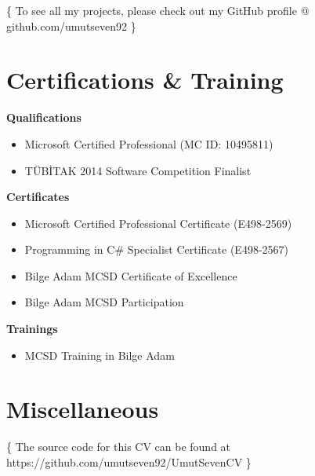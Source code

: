 \documentclass[11pt,a4paper,sans]{moderncv}        %
\begin{document}
\vspace{5px}

\color{color2} \centerline {\{ To see all my projects, please check out my GitHub profile @ github.com/umutseven92 \}}
\color{color3}

\vspace{5px}


\section{Certifications \& Training}
\vspace{5px}

\textbf{Qualifications}
\begin{itemize}
\item Microsoft Certified Professional (MC ID: 10495811)
\item TÜBİTAK 2014 Software Competition Finalist\newline{}
\end{itemize}
\textbf{Certificates}
\begin{itemize}
\item Microsoft Certified Professional Certificate (E498-2569)
\item Programming in C\# Specialist Certificate (E498-2567)
\item Bilge Adam MCSD Certificate of Excellence
\item Bilge Adam MCSD Participation\newline{}
\end{itemize}

\textbf{Trainings}
\begin{itemize}
\item MCSD Training in Bilge Adam\newline{}
\end{itemize}

\vspace{5px}


\section{Miscellaneous}
\vspace{5px}


               
\vspace*{\fill}
\color{color2} \centerline{\{ The source code for this CV can be found at https://github.com/umutseven92/UmutSevenCV \}}
\end{document}

